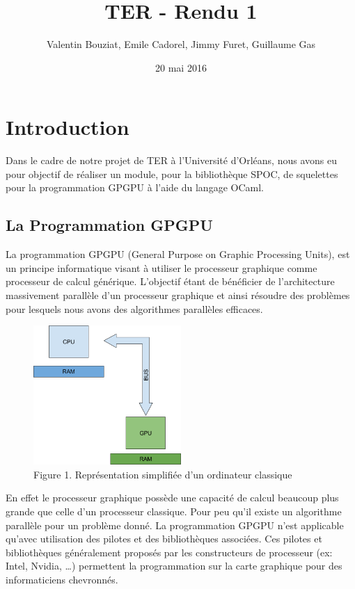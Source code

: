 \documentclass{report}
\title{TER - Rendu 1}
\author{Valentin Bouziat, Emile Cadorel, Jimmy Furet, Guillaume Gas}
\date{20 mai 2016}
\begin{document}
\maketitle

\chapter{Introduction}
Dans le cadre de notre projet de TER à l’Université d’Orléans, nous avons eu pour objectif de réaliser un module, pour la bibliothèque SPOC, de squelettes pour la programmation GPGPU à l’aide du langage OCaml.

\section{La Programmation GPGPU}
La programmation GPGPU\cite{refProgGPGPU} (General Purpose on Graphic Processing Units), est un principe informatique visant à utiliser le processeur graphique comme processeur de calcul générique. L’objectif étant de bénéficier de l’architecture massivement parallèle d’un processeur graphique et ainsi résoudre des problèmes pour lesquels nous avons des algorithmes parallèles efficaces.\newline \newline

\begin{figure}[!h]
\begin{center}
\includegraphics[height=150pt]{images_finales/image1.png}
\end{center}
\caption{Figure 1. Représentation simplifiée d'un ordinateur classique}
\label{test1}
\end{figure}

En effet le processeur graphique possède une capacité de calcul beaucoup plus grande que celle d’un processeur classique. Pour peu qu’il existe un algorithme parallèle pour un problème donné. La programmation GPGPU n’est applicable qu’avec utilisation des pilotes et des bibliothèques associées. Ces pilotes et bibliothèques généralement proposés par les constructeurs de processeur (ex: Intel, Nvidia, …) permettent la programmation sur la carte graphique pour des informaticiens chevronnés.\newline 
\end{document}
